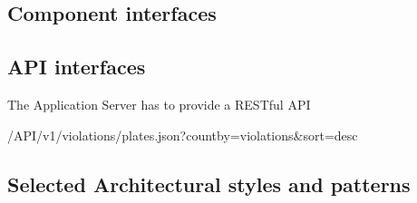 \subsection{Component interfaces}


\subsection{API interfaces}

The Application Server has to provide a RESTful API


/API/v1/violations/plates.json?countby=violations&sort=desc





\subsection{Selected Architectural styles and patterns}
 \label{cleanArchiref}
